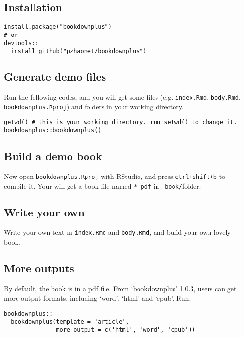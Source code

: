 \documentclass[]{article}
\begin{document}
\subsection{Installation}\label{installation}

\begin{verbatim}
install.package("bookdownplus")
# or
devtools::
  install_github("pzhaonet/bookdownplus")
\end{verbatim}

\subsection{Generate demo files}\label{generate-demo-files}

Run the following codes, and you will get some files (e.g.
\texttt{index.Rmd}, \texttt{body.Rmd}, \texttt{bookdownplus.Rproj}) and
folders in your working directory.

\begin{verbatim}
getwd() # this is your working directory. run setwd() to change it.
bookdownplus::bookdownplus()
\end{verbatim}

\subsection{Build a demo book}\label{build-a-demo-book}

Now open \texttt{bookdownplus.Rproj} with RStudio, and press
\texttt{ctrl+shift+b} to compile it. Your will get a book file named
\texttt{*.pdf} in \texttt{\_book/}folder.

\subsection{Write your own}\label{write-your-own}

Write your own text in \texttt{index.Rmd} and \texttt{body.Rmd}, and
build your own lovely book.

\subsection{More outputs}\label{more-outputs}

By default, the book is in a pdf file. From `bookdownplus' 1.0.3, users
can get more output formats, including `word', `html' and `epub'. Run:

\begin{verbatim}
bookdownplus::
  bookdownplus(template = 'article', 
               more_output = c('html', 'word', 'epub'))
\end{verbatim}
\end{document}
